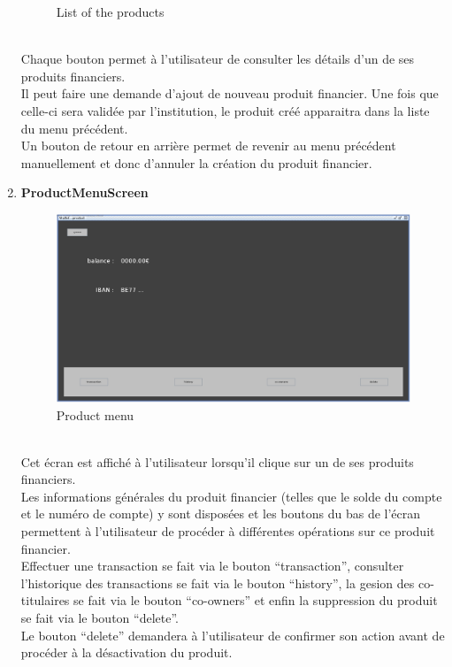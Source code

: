 \documentclass[../rapport.tex]{subfiles}
\begin{document}
\begin{enumerate}
\begin{figure}[h!]
				\caption{List of the products}
		\end{figure}
		\\
Chaque bouton permet à l'utilisateur de consulter les détails d'un de ses produits financiers.\\
Il peut faire une demande d'ajout de nouveau produit financier. Une fois que celle-ci sera validée par l'institution, le produit créé apparaitra dans la liste du menu précédent.\\
Un bouton de retour en arrière permet de revenir au menu précédent manuellement et donc d'annuler la création du produit financier.
\newpage
\item \textbf{ProductMenuScreen}\\
		\begin{figure}[h!]
				\centering \includegraphics[scale=0.2]{ressources/photos_diagrammes/app1/gui/productMenu.jpg}
				\caption{Product menu}
		\end{figure}
		\\
Cet écran est affiché à l'utilisateur lorsqu'il clique sur un de ses produits financiers. \\
Les informations générales du produit financier (telles que le solde du compte et le numéro de compte) y sont disposées et les boutons du bas de l'écran permettent à l'utilisateur de procéder à différentes opérations sur ce produit financier.\\
Effectuer une transaction se fait via le bouton ``transaction'', consulter l'historique des transactions se fait via le bouton ``history'',
la gesion des co-titulaires se fait via le bouton ``co-owners'' et enfin la suppression du produit se fait via le bouton ``delete''.\\
Le bouton ``delete'' demandera à l'utilisateur de confirmer son action avant de procéder à la désactivation du produit.\\

\end{enumerate}
\end{document}
